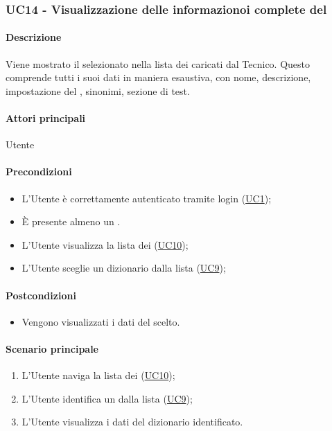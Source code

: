 \subsubsection{UC14 - Visualizzazione delle informazionoi complete del }\label{UC14}
\paragraph*{Descrizione}
Viene mostrato il  selezionato nella lista dei  caricati dal Tecnico. Questo comprende tutti i suoi dati in maniera esaustiva, con nome, descrizione, impostazione del , sinonimi, sezione di test.

\paragraph*{Attori principali}
Utente

\paragraph*{Precondizioni}
\begin{itemize}
  \item L'Utente è correttamente autenticato tramite login (\hyperref[UC1]{UC1});
  \item È presente almeno un .
  \item L'Utente visualizza la lista dei  (\hyperref[UC10]{UC10});
  \item L'Utente sceglie un dizionario dalla lista (\hyperref[UC9]{UC9});
\end{itemize}

\paragraph*{Postcondizioni}
\begin{itemize}
  \item Vengono visualizzati i dati del  scelto.
\end{itemize}

\paragraph*{Scenario principale}
\begin{enumerate}
  \item L'Utente naviga la lista dei  (\hyperref[UC10]{UC10});
  \item L'Utente identifica un  dalla lista (\hyperref[UC9]{UC9});
  \item L'Utente visualizza i dati del dizionario identificato.
\end{enumerate}

